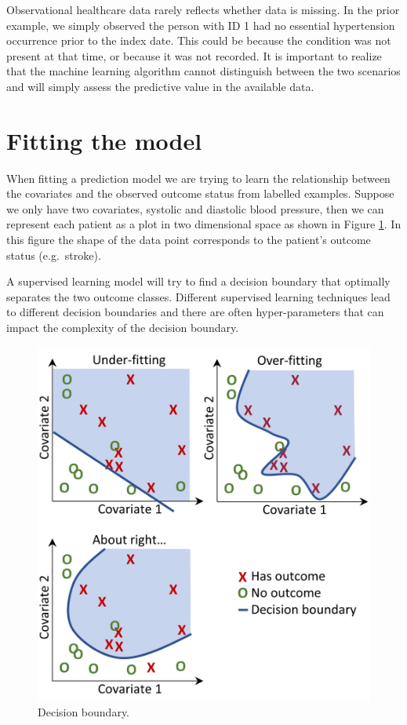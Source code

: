 \documentclass[11pt]{book}
\theoremstyle{definition}
\theoremstyle{definition}
\theoremstyle{definition}
\theoremstyle{remark}
\begin{document}
Observational healthcare data rarely reflects whether data is missing. In the prior example, we simply observed the person with ID 1 had no essential hypertension occurrence prior to the index date. This could be because the condition was not present at that time, or because it was not recorded. It is important to realize that the machine learning algorithm cannot distinguish between the two scenarios and will simply assess the predictive value in the available data. 

\hypertarget{modelFitting}{%
\section{Fitting the model}\label{modelFitting}}

When fitting a prediction model we are trying to learn the relationship between the covariates and the observed outcome status from labelled examples. Suppose we only have two covariates, systolic and diastolic blood pressure, then we can represent each patient as a plot in two dimensional space as shown in Figure \ref{fig:decisionBoundary}. In this figure the shape of the data point corresponds to the patient's outcome status (e.g.~stroke).

A supervised learning model will try to find a decision boundary that optimally separates the two outcome classes. Different supervised learning techniques lead to different decision boundaries and there are often hyper-parameters that can impact the complexity of the decision boundary. 

\begin{figure}

{\centering \includegraphics[width=0.8\linewidth]{images/PatientLevelPrediction/decisionBoundary} 

}

\caption{Decision boundary.}\label{fig:decisionBoundary}
\end{figure}
\end{document}
